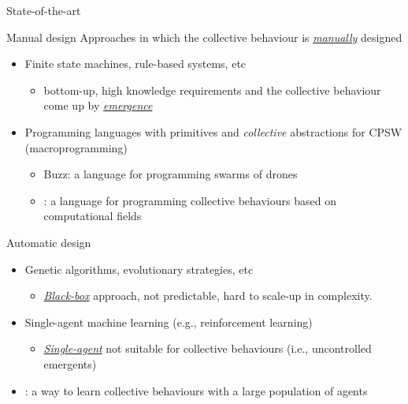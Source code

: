 \documentclass[presentation, 9pt,169]{beamer}\mode<presentation>{\usetheme{AMSBolognaFC}}
\begin{document}
\begin{frame}{State-of-the-art}
  \begin{exampleblock}{Manual design}
  Approaches in which the collective behaviour is \emph{\underline{manually}} designed
  \begin{itemize}
    \item Finite state machines, rule-based systems, etc
    \begin{itemize}
      \item bottom-up, high knowledge requirements and the collective behaviour come up by \emph{\underline{emergence}}
    \end{itemize}
    \item Programming languages with primitives and \emph{collective} abstractions for CPSW (macroprogramming)
    \begin{itemize}
      \item Buzz: a language for programming swarms of drones
      \item {}: a language for programming collective behaviours based on computational fields
    \end{itemize}
  \end{itemize}  
  
  \end{exampleblock}
  \begin{exampleblock}{Automatic design}
    \begin{itemize}
      \item Genetic algorithms, evolutionary strategies, etc
      \begin{itemize}
        \item \emph{\underline{Black-box}} approach, not predictable, hard to scale-up in complexity.
      \end{itemize}
      \item Single-agent machine learning (e.g., reinforcement learning)
      \begin{itemize}
        \item \emph{\underline{Single-agent}} not suitable for collective behaviours (i.e., uncontrolled emergents)
      \end{itemize}
      \item {}: a way to learn collective behaviours with a large population of agents
    \end{itemize}
  \end{exampleblock}
\end{frame}
\end{document}
